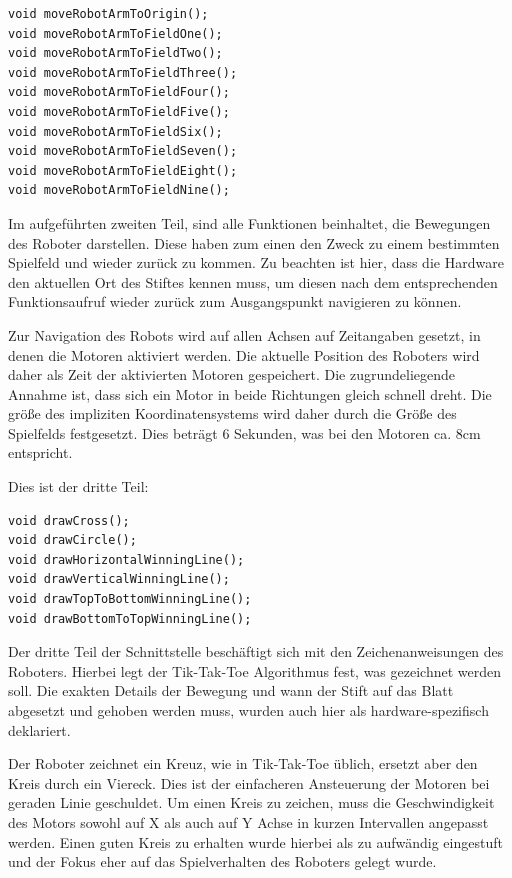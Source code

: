 \documentclass[conference,compsoc,final,a4paper]{IEEEtran}
\begin{document}
\begin{verbatim}
void moveRobotArmToOrigin();
void moveRobotArmToFieldOne();
void moveRobotArmToFieldTwo();
void moveRobotArmToFieldThree();
void moveRobotArmToFieldFour();
void moveRobotArmToFieldFive();
void moveRobotArmToFieldSix();
void moveRobotArmToFieldSeven();
void moveRobotArmToFieldEight();
void moveRobotArmToFieldNine();
\end{verbatim}

Im aufgeführten zweiten Teil, sind alle Funktionen beinhaltet, die Bewegungen des Roboter darstellen. Diese haben
zum einen den Zweck zu einem bestimmten Spielfeld und wieder zurück zu kommen. Zu beachten ist hier,
dass die Hardware den aktuellen Ort des Stiftes kennen muss, um diesen nach dem entsprechenden Funktionsaufruf
wieder zurück zum Ausgangspunkt navigieren zu können.

Zur Navigation des Robots wird auf allen Achsen auf Zeitangaben gesetzt, in denen die Motoren aktiviert werden. Die
aktuelle Position des Roboters wird daher als Zeit der aktivierten Motoren gespeichert. Die zugrundeliegende Annahme
ist, dass sich ein Motor in beide Richtungen gleich schnell dreht. Die größe des impliziten Koordinatensystems wird
daher durch die Größe des Spielfelds festgesetzt. Dies beträgt 6 Sekunden, was bei den Motoren ca. 8cm entspricht.

Dies ist der dritte Teil:

\begin{verbatim}
void drawCross();
void drawCircle();
void drawHorizontalWinningLine();
void drawVerticalWinningLine();
void drawTopToBottomWinningLine();
void drawBottomToTopWinningLine();
\end{verbatim}

Der dritte Teil der Schnittstelle beschäftigt sich mit den Zeichenanweisungen des Roboters. Hierbei legt der
Tik-Tak-Toe Algorithmus fest, was gezeichnet werden soll. Die exakten Details der Bewegung und wann der Stift
auf das Blatt abgesetzt und gehoben werden muss, wurden auch hier als hardware-spezifisch deklariert.

Der Roboter zeichnet ein Kreuz, wie in Tik-Tak-Toe üblich, ersetzt aber den Kreis durch ein Viereck. Dies ist
der einfacheren Ansteuerung der Motoren bei geraden Linie geschuldet. Um einen Kreis zu zeichen, muss die
Geschwindigkeit des Motors sowohl auf X als auch auf Y Achse in kurzen Intervallen angepasst werden. Einen 
guten Kreis zu erhalten wurde hierbei als zu aufwändig eingestuft und der Fokus eher auf das Spielverhalten
des Roboters gelegt wurde.
\end{document}
